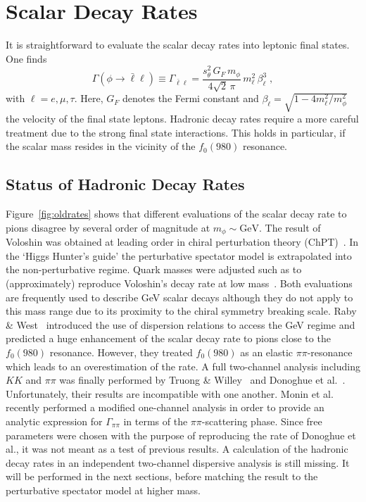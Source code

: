 \documentclass[preprintnumbers,twocolumn,aps,floats,nofootinbib]{revtex4-1}
\begin{document}
\section{Scalar Decay Rates}\label{sec:scalardecay}

It is straightforward to evaluate the scalar decay rates into leptonic final states. One finds
\begin{equation}\label{eq:mudecay}
 \Gamma (\phi\rightarrow \bar{\ell}\ell) \equiv \Gamma_{\bar{\ell}\ell} = \frac{s_\theta^2\,G_F\,m_\phi}{4\sqrt{2}\,\pi}\, m_\ell^2\,\beta_\ell^3\;,
\end{equation}
with $\ell=e,\mu,\tau$. Here, $G_F$ denotes the Fermi constant and $\beta_\ell = \sqrt{1-4m_\ell^2/m_\phi^2}$ 
the velocity of the final state leptons. Hadronic decay rates require a more careful treatment due to the strong final state interactions. This holds in particular, if the scalar mass resides in the vicinity of the $f_0(980)$ resonance.


\subsection{Status of Hadronic Decay Rates}
Figure~\ref{fig:oldrates} shows that different evaluations of the scalar decay rate to pions disagree by several order of magnitude at $m_\phi\sim\text{GeV}$. The result of Voloshin was obtained at leading order in chiral perturbation theory (ChPT)~\cite{Voloshin:1985tc}. In the `Higgs Hunter's guide' the perturbative spectator model is extrapolated into the non-perturbative regime. Quark masses were adjusted such as to (approximately) reproduce Voloshin's decay rate at low mass~\cite{Gunion:1989we}. Both evaluations are frequently used to describe GeV scalar decays although they do not apply to this mass range due to its proximity to the chiral symmetry breaking scale. Raby \& West~\cite{Raby:1988qf} introduced the use of dispersion relations to access the GeV regime and predicted a huge enhancement of the scalar decay rate to pions close to the $f_0(980)$ resonance. However, they treated $f_0(980)$ as an elastic $\pi\pi$-resonance which leads to an overestimation of the rate. A full two-channel analysis including $KK$ and $\pi\pi$ was finally performed by Truong \& Willey~\cite{Truong:1989my} and Donoghue et al.~\cite{Donoghue:1990xh}. Unfortunately, their results are incompatible with one another. Monin et al.~\cite{Monin:2018lee} recently performed a modified one-channel analysis in order to provide an analytic expression for $\Gamma_{\pi\pi}$ in terms of the $\pi\pi$-scattering phase. Since free parameters were chosen with the purpose of reproducing the rate of Donoghue et al., it was not meant as a test of previous results. A calculation of the hadronic decay rates in an independent two-channel dispersive analysis is still missing. It will be performed in the next sections, before matching the result to the perturbative spectator model at higher mass.
\end{document}
